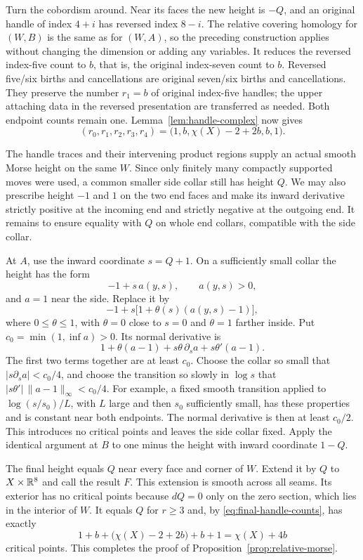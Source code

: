 Turn the cobordism around.  Near its faces the new height is $-Q$,
and an original handle of index $4+i$ has reversed index $8-i$.
The relative covering homology for $(W,B)$ is the same as for $(W,A)$,
so the preceding construction applies without changing the dimension
or adding any variables.  It reduces the reversed index-five count
to $b$, that is, the original index-seven count to $b$.
Reversed five/six births and cancellations are original seven/six
births and cancellations.  They preserve the number $r_1=b$ of original
index-five handles; the upper attaching data in the reversed
presentation are transferred as needed.  Both endpoint counts remain
one.  Lemma~\ref{lem:handle-complex} now gives
\begin{equation}
 (r_0,r_1,r_2,r_3,r_4)
   =\bigl(1,b,\chi(X)-2+2b,b,1\bigr).
 \label{eq:final-handle-counts}
\end{equation}

The handle traces and their intervening product regions supply an
actual smooth Morse height on the same $W$.  Since only finitely many
compactly supported moves were used, a common smaller side collar
still has height $Q$.  We may also prescribe height $-1$ and $1$ on
the two end faces and make its inward derivative strictly positive
at the incoming end and strictly negative at the outgoing end.
It remains to ensure equality with $Q$ on whole end collars, compatible
with the side collar.

At $A$, use the inward coordinate $s=Q+1$.  On a sufficiently small
collar the height has the form
\[
 -1+s\,a(y,s),\qquad a(y,s)>0,
\]
and $a=1$ near the side.  Replace it by
\[
 -1+s\bigl[1+\theta(s)(a(y,s)-1)\bigr],
\]
where $0\leq\theta\leq1$, with $\theta=0$ close to $s=0$ and
$\theta=1$ farther inside.
Put $c_0=\min(1,\inf a)>0$.  Its normal derivative is
\[
 1+\theta(a-1)+s\theta\,\partial_sa+s\theta'(a-1).
\]
The first two terms together are at least $c_0$.  Choose the collar
so small that $|s\partial_sa|<c_0/4$, and choose the transition so
slowly in $\log s$ that
$|s\theta'|\,\|a-1\|_\infty<c_0/4$.
For example, a fixed smooth transition applied to
$\log(s/s_0)/L$, with $L$ large and then $s_0$ sufficiently small,
has these properties and is constant near both endpoints.
The normal derivative is then at least $c_0/2$.
This introduces no critical points and leaves the side collar fixed.
Apply the identical argument at $B$ to one minus the height with
inward coordinate $1-Q$.

The final height equals $Q$ near every face and corner of $W$.
Extend it by $Q$ to $X\times\mathbb R^8$ and call the result $F$.
This extension is smooth across all seams.  Its exterior has no
critical points because $dQ=0$ only on the zero section, which lies
in the interior of $W$.  It equals $Q$ for $r\geq3$ and, by
\eqref{eq:final-handle-counts}, has exactly
\[
 1+b+\bigl(\chi(X)-2+2b\bigr)+b+1=\chi(X)+4b
\]
critical points.  This completes the proof of
Proposition~\ref{prop:relative-morse}.
